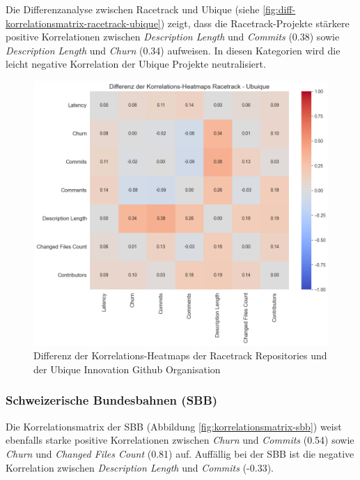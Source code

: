 Die Differenzanalyse zwischen Racetrack und Ubique (siehe \autoref{fig:diff-korrelationsmatrix-racetrack-ubique}) zeigt, dass die Racetrack-Projekte stärkere positive Korrelationen zwischen \textit{Description Length} und \textit{Commits} (0.38) sowie \textit{Description Length} und \textit{Churn} (0.34) aufweisen. In diesen Kategorien wird die leicht negative Korrelation der Ubique Projekte neutralisiert.  

\begin{figure}[htbp]
\includegraphics[width=\textwidth]{Figures/diff-korrelationsmatrix-racetrack-ubique.png}
\caption{Differenz der Korrelations-Heatmaps der Racetrack Repositories und der Ubique Innovation Github Organisation}
\label{fig:diff-korrelationsmatrix-racetrack-ubique}
\end{figure}

\newpage
\subsubsection{Schweizerische Bundesbahnen (SBB)}
Die Korrelationsmatrix der SBB (Abbildung \autoref{fig:korrelationsmatrix-sbb}) weist ebenfalls starke positive Korrelationen zwischen \textit{Churn} und \textit{Commits} (0.54) sowie \textit{Churn} und \textit{Changed Files Count} (0.81) auf. Auffällig bei der SBB ist die negative Korrelation zwischen \textit{Description Length} und \textit{Commits} (-0.33).

